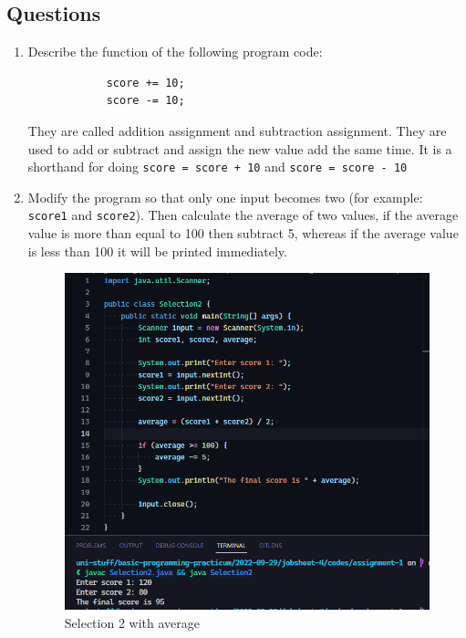 \documentclass[12pt,titlepage]{article}
\begin{document}
\subsection*{Questions}
\begin{enumerate}
    \item {
        Describe the function of the following program code:

        \begin{verbatim}
            score += 10;
            score -= 10;
        \end{verbatim}

        They are called addition assignment and subtraction assignment. They are used
        to add or subtract and assign the new value add the same time. It is a shorthand
        for doing \texttt{score = score + 10} and \texttt{score = score - 10}
    }
    \pagebreak
    \item {
        Modify the program so that only one input becomes two (for example: \texttt{score1} and \texttt{score2}).
        Then calculate the average of two values, if the average value is more than equal to 100 then subtract 5, whereas
        if the average value is less than 100 it will be printed immediately. 

        \begin{figure}[h]
            \centering
            \includegraphics[width=.8\textwidth]{./images/selection-2-average.png}
            \caption{Selection 2 with average}
        \end{figure}
    }
\end{enumerate}
\end{document}
